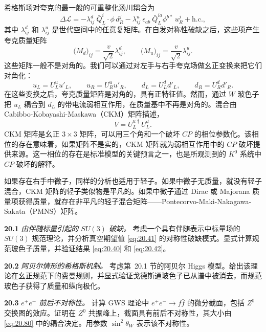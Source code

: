 希格斯场对夸克的最一般的可重整化汤川耦合为
\begin{equation}
  \Delta\mathcal{L} = -\lambda^d_{ij}\ \bar{Q}^i_L\cdot\phi\,d^j_R
    - \lambda^u_{ij}\ \epsilon_{ab}\ \bar{Q}^{ia}_L\phi^{b*}\,u^j_R
    + \mathrm{h.c.} ,
  \label{eq:20.133}
\end{equation}
其中 $\lambda^d_{ij}$ 和 $\lambda^u_{ij}$ 是世代空间中的任意复矩阵。在自发对称性破缺之后，这些项产生夸克质量矩阵
\begin{equation}
  \bigl( M_d \bigr)_{ij} = \frac{v}{\sqrt{2}}\lambda^d_{ij},\qquad
  \bigl( M_u \bigr)_{ij} = \frac{v}{\sqrt{2}}\lambda^u_{ij} .
\end{equation}
这些矩阵一般不是对角的。我们可以通过对左手与右手夸克场做幺正变换来把它们对角化：
\begin{equation}
  u_L = U^u_L u'_L,\qquad u_R = U^u_R u'_R,\qquad
  d_L = U^d_L d'_L,\qquad d_R = U^d_R d'_R .
  \label{eq:20.134}
\end{equation}
在这些变换之后，夸克质量矩阵是对角的，具有正特征值。然而，通过 $W$ 玻色子把 $u_L$ 耦合到 $d_L$ 的带电流弱相互作用，在质量基中不再是对角的。混合由 Cabibbo-Kobayashi-Maskawa（CKM）矩阵描述，
\begin{equation}
  V = U^{u\dagger}_L U^d_L .
  \label{eq:20.135}
\end{equation}
CKM 矩阵是幺正 $3\times3$ 矩阵，可以用三个角和一个破坏 $CP$ 的相位参数化。该相位的存在意味着，如果矩阵不是实的，CKM 矩阵就为弱相互作用中的 $CP$ 破坏提供来源。这一相位的存在是标准模型的关键预言之一，也是所观测到的 $K^0$ 系统中 $CP$ 破坏的解释。

如果存在右手中微子，同样的分析也适用于轻子。如果中微子无质量，就没有轻子混合，CKM 矩阵的轻子类似物是平凡的。如果中微子通过 Dirac 或 Majorana 质量项获得质量，就存在非平凡的轻子混合矩阵——Pontecorvo-Maki-Nakagawa-Sakata（PMNS）矩阵。

\problems

\textbf{20.1} \emph{由伴随标量引起的 $SU(3)$ 破缺。} 考虑一个具有伴随表示中标量场的 $SU(3)$ 规范理论，并分析真空期望值 \eqref{eq:20.41} 的对称性破缺模式。显式计算规范玻色子质量，并验证结果 \eqref{eq:20.40} 和 \eqref{eq:20.42}。

\textbf{20.2} \emph{阿贝尔情形的希格斯机制。} 考虑第~20.1 节的阿贝尔 Higgs 模型。给出该理论在幺正规范下的费曼规则，并显式验证戈德斯通玻色子已从谱中被消去，而规范玻色子获得了质量和纵向极化。

\textbf{20.3} \emph{$e^{+}e^{-}$ 前后不对称性。} 计算 GWS 理论中 $e^{+}e^{-}\to f\bar{f}$ 的微分截面，包括 $Z^0$ 交换图的效应。证明在 $Z^0$ 共振峰上，截面具有前后不对称性，其大小由 \eqref{eq:20.80} 中的耦合决定。用参数 $\sin^2\theta_W$ 表示该不对称性。

